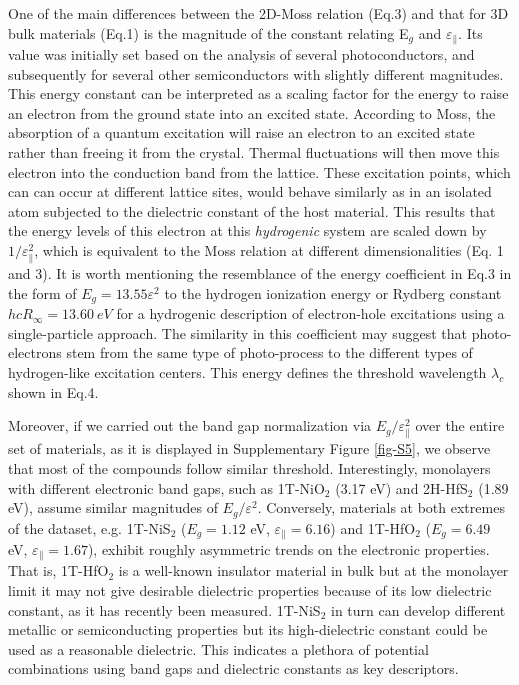 \documentclass[journal=ancac3,manuscript=article,email=true,hyperref=true,keywords=true]{achemso}
\begin{document}
One of the main differences between 
the 2D-Moss relation (Eq.3) and that for 
3D bulk materials (Eq.1)
is the magnitude of the constant relating E$_{g}$ and \(\varepsilon_{\parallel}\). 
Its value was initially set based on the analysis of several 
photoconductors\cite{Moss_1950_relation}, and subsequently for several 
other semiconductors\cite{Moss-book1} with slightly different magnitudes. 
This energy constant can be interpreted 
as a scaling factor for the energy to raise an electron from the ground state into an 
excited state. According to Moss\cite{Moss_1950_relation,Moss52book,Moss59book,Moss_1985_n_Eg}, 
the absorption of a quantum excitation will raise an electron to an excited state rather than freeing it 
from the crystal. Thermal fluctuations will then move this electron into the conduction 
band from the lattice. These excitation points, which can can occur at different lattice sites, 
would behave similarly as in an isolated atom subjected to the 
dielectric constant of the host material\cite{Moss52book,Moss59book}. 
This results that the energy levels of this electron 
at this {\it hydrogenic} system are scaled down by $1/\varepsilon_{\parallel}^{2}$, 
which is equivalent 
to the Moss relation at different dimensionalities (Eq. 1 and 3). 
It is worth mentioning the resemblance of the energy coefficient in Eq.3 in the form of 
$E_g=13.55\varepsilon^{2}$ to the hydrogen ionization energy or Rydberg 
constant $hcR_{\infty}=13.60~eV$ 
for a hydrogenic description of electron-hole excitations 
using a single-particle approach.   
The similarity in this coefficient may suggest that 
photo-electrons stem from the same type of photo-process to the different types of 
hydrogen-like excitation centers. This energy defines the threshold 
wavelength $\lambda_{c}$ shown in Eq.4. 

Moreover, if we carried out the band gap normalization via $E_{g}/\varepsilon_{\parallel}^{2}$ 
over the entire set of materials, as it is displayed 
in Supplementary Figure \ref{fig-S5}, we observe that most of the compounds follow similar threshold. 
Interestingly, monolayers with different electronic band gaps, 
such as 1T-NiO$_2$ (3.17 eV) and 2H-HfS$_2$ (1.89 eV), assume similar magnitudes of 
$E_{g}/\varepsilon^{2}$. Conversely, materials at both extremes of the dataset, e.g. 
1T-NiS$_2$ ($E_{g}=1.12$ eV, $\varepsilon_{\parallel}=6.16$) and 1T-HfO$_2$ ($E_{g}=6.49$ eV, 
$\varepsilon_{\parallel}=1.67$), exhibit roughly asymmetric trends on the electronic properties. 
That is, 1T-HfO$_2$ is a well-known insulator material in bulk\cite{Robertson:2004aa} 
but at the monolayer limit it may not 
give desirable dielectric properties because of its low dielectric constant, as it has recently been 
measured\cite{Zhang:2015aa}. 1T-NiS$_2$ in turn 
can develop different metallic or semiconducting properties\cite{Townsend:1971aa,Molla:2016aa} but its high-dielectric constant could be used as a reasonable dielectric. 
This indicates a plethora of potential combinations using band gaps and dielectric constants as key descriptors. 
\end{document}
